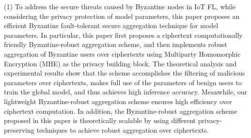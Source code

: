 \begin{eabstract}
(1) To address the secure threats caused by Byzantine nodes in IoT FL, while considering the privacy protection of model parameters, this paper proposes an efficient Byzantine fault-tolerant secure aggregation technique for model parameters.
In particular, this paper first proposes a ciphertext computationally friendly Byzantine-robust aggregation scheme, and then implements robust aggregation of Byzantine users over ciphertexts using Multiparty Homomorphic Encryption (MHE) as the privacy building block. The theoretical analysis and experimental results show that the scheme accomplishes the filtering of malicious parameters over ciphertexts, makes full use of the parameters of benign users to train the global model, and thus achieves high inference accuracy. Meanwhile, our lightweight Byzantine-robust aggregation scheme ensures high efficiency over ciphertext computation. In addition, the Byzantine-robust aggregation scheme proposed in this paper is theoretically scalable by using different privacy-preserving techniques to achieve robust aggregation over ciphertexts.


\end{eabstract}
